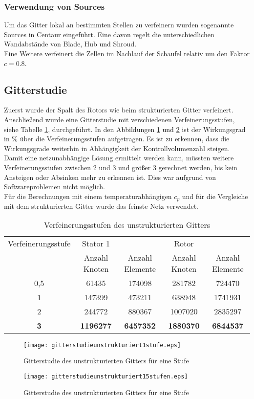 \subsubsection{Verwendung von Sources}
Um das Gitter lokal an bestimmten Stellen zu verfeinern wurden sogenannte Sources in Centaur eingeführt.
Eine davon regelt die unterschiedlichen Wandabstände von Blade, Hub und Shroud.\\
Eine Weitere verfeinert die Zellen im Nachlauf der Schaufel relativ um den Faktor $c = 0.8$.

\subsection{Gitterstudie}
Zuerst wurde der Spalt des Rotors wie beim strukturierten Gitter verfeinert. Anschließend wurde eine Gitterstudie mit verschiedenen Verfeinerungsstufen, siehe Tabelle \ref{tab:verfeinerungenunstrukturiert}, durchgeführt. In den Abbildungen \ref{fig:gitterunstrukturiert1stufe} und \ref{fig:gitterunstrukturiert15stufen} ist der Wirkungsgrad in \% über die Verfeinerungsstufen aufgetragen. Es ist zu erkennen, dass die Wirkungsgrade weiterhin in Abhängigkeit der Kontrollvolumenzahl steigen. Damit eine netzunabhängige Lösung ermittelt werden kann, müssten weitere Verfeinerungsstufen zwischen 2 und 3 und größer 3 gerechnet werden, bis kein Ansteigen oder Absinken mehr zu erkennen ist. Dies war aufgrund von Softwareproblemen nicht möglich.\\
Für die Berechnungen mit einem temperaturabhängigen $c_p$ und für die Vergleiche mit dem strukturierten Gitter wurde das feinste Netz verwendet.
\begin{table}[h]
		\centering
		\caption{Verfeinerungsstufen des unstrukturierten Gitters}
	\begin{tabular}{ c| c | c| c| c}
Verfeinerungsstufe	&	Stator 1	&		&	Rotor	&		\\
&	Anzahl Knoten	&	Anzahl Elemente	&	Anzahl Knoten	&	Anzahl Elemente	\\
\hline									
0,5	&	61435	&	174098	&	281782	&	724470	\\
1	&	147399	&	473211	&	638948	&	1741931	\\
2	&	244772	&	880367	&	1007020	&	2835297	\\
\textbf{3}	&	\textbf{1196277}	&	\textbf{6457352}	&	\textbf{1880370}	&	\textbf{6844537}	\\

	\end{tabular}
		\label{tab:verfeinerungenunstrukturiert}
\end{table}
\begin{figure}[htbp]
	\centering
	\texttt{[image: gitterstudieunstrukturiert1stufe.eps]}
	\caption{Gitterstudie des unstrukturierten Gitters für eine Stufe} \label{fig:gitterunstrukturiert1stufe}
\end{figure}

\begin{figure}[htbp]
	\centering
	\texttt{[image: gitterstudieunstrukturiert15stufen.eps]}
	\caption{Gitterstudie des unstrukturierten Gitters für eine Stufe}
	\label{fig:gitterunstrukturiert15stufen}
\end{figure}